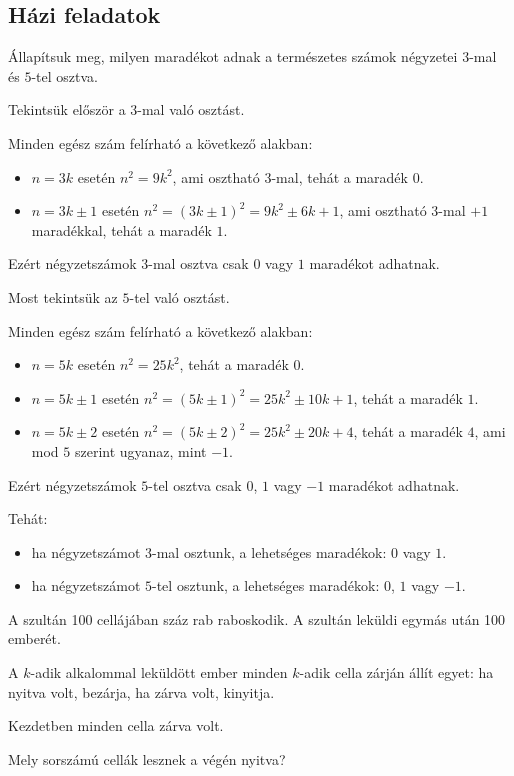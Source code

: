 \subsection*{Házi feladatok}
\begin{problem}
Állapítsuk meg, milyen maradékot adnak a természetes számok négyzetei
$3$-mal és $5$-tel osztva. 
\end{problem}

\begin{solution}
Tekintsük először a $3$-mal való osztást.

Minden egész szám felírható a következő alakban: 
\begin{itemize}
\item $n=3k$ esetén $n^{2}=9k^{2}$, ami osztható $3$-mal, tehát a maradék
$0$. 
\item $n=3k\pm1$ esetén $n^{2}=(3k\pm1)^{2}=9k^{2}\pm6k+1$, ami osztható
$3$-mal $+1$ maradékkal, tehát a maradék $1$. 
\end{itemize}
Ezért négyzetszámok $3$-mal osztva csak $0$ vagy $1$ maradékot
adhatnak.

\vspace{1em}

Most tekintsük az $5$-tel való osztást.

Minden egész szám felírható a következő alakban: 
\begin{itemize}
\item $n=5k$ esetén $n^{2}=25k^{2}$, tehát a maradék $0$. 
\item $n=5k\pm1$ esetén $n^{2}=(5k\pm1)^{2}=25k^{2}\pm10k+1$, tehát a
maradék $1$. 
\item $n=5k\pm2$ esetén $n^{2}=(5k\pm2)^{2}=25k^{2}\pm20k+4$, tehát a
maradék $4$, ami mod $5$ szerint ugyanaz, mint $-1$. 
\end{itemize}
Ezért négyzetszámok $5$-tel osztva csak $0$, $1$ vagy $-1$ maradékot
adhatnak.

Tehát: 
\begin{itemize}
\item ha négyzetszámot $3$-mal osztunk, a lehetséges maradékok: $0$ vagy
$1$. 
\item ha négyzetszámot $5$-tel osztunk, a lehetséges maradékok: $0$, $1$
vagy $-1$.
\end{itemize}
\end{solution}
\begin{problem}
A szultán 100 cellájában száz rab raboskodik. A szultán leküldi egymás
után 100 emberét.

A $k$-adik alkalommal leküldött ember minden $k$-adik cella zárján
állít egyet: ha nyitva volt, bezárja, ha zárva volt, kinyitja.

Kezdetben minden cella zárva volt.

Mely sorszámú cellák lesznek a végén nyitva? 
\end{problem}

